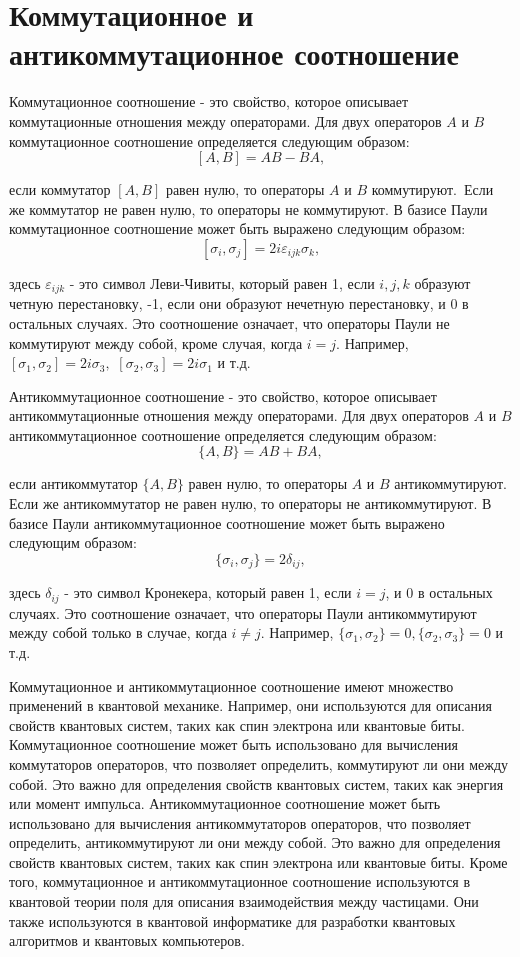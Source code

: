 \documentclass[a4paper]{report}
\begin{document}
\section{Коммутационное и антикоммутационное соотношение}

Коммутационное соотношение - это свойство, которое описывает коммутационные отношения между операторами. Для двух операторов ${A}$ и ${B}$ коммутационное соотношение определяется следующим образом:
$${[A, B] = AB - BA,}$$

\noindent если коммутатор ${[A, B]}$ равен нулю, то операторы ${A}$ и ${B}$ \mbox{коммутируют. Если} же коммутатор не равен нулю, то операторы не коммутируют. В базисе Паули коммутационное соотношение может быть выражено следующим образом:
$${[\sigma_i, \sigma_j] = 2i\varepsilon_{ijk}\sigma_k,}$$

\noindent здесь ${\varepsilon_{ijk}}$ - это символ Леви-Чивиты, который равен 1, если ${i, j, k}$ образуют четную перестановку, -1, если они образуют нечетную перестановку, и 0 в остальных случаях. Это соотношение означает, что операторы Паули не коммутируют между собой, кроме случая, когда ${i = j}$. Например, ${[\sigma_1, \sigma_2] = 2i\sigma_3,}$ ${[\sigma_2,\sigma_3] = 2i\sigma_1}$ и т.д.

Антикоммутационное соотношение - это свойство, которое описывает антикоммутационные отношения между операторами. Для двух операторов ${A}$ и ${B}$ антикоммутационное соотношение определяется следующим образом:
$${\{A, B\} = AB + BA,}$$

\noindent если антикоммутатор ${\{A, B}\}$ равен нулю, то операторы ${A}$ и ${B}$ антикоммутируют. Если же антикоммутатор не равен нулю, то операторы не антикоммутируют. В базисе Паули антикоммутационное соотношение может быть выражено следующим образом:
$${\{\sigma_i, \sigma_j\} = 2\delta_{ij},}$$

\noindent здесь ${\delta_{ij}}$ - это символ Кронекера, который равен 1, если ${i = j}$, и 0 в остальных случаях. Это соотношение означает, что операторы Паули антикоммутируют между собой только в случае, когда ${i \neq j}$. Например, ${\{\sigma_1, \sigma_2\} = 0, \{\sigma_2, \sigma_3\} = 0}$ и т.д.

Коммутационное и антикоммутационное соотношение имеют множество применений в квантовой механике. Например, они используются для описания свойств квантовых систем, таких как спин электрона или квантовые биты. Коммутационное соотношение может быть использовано для вычисления коммутаторов операторов, что позволяет определить, коммутируют ли они между собой. Это важно для определения свойств квантовых систем, таких как энергия или момент импульса.
Антикоммутационное соотношение может быть использовано для вычисления антикоммутаторов операторов, что позволяет определить, антикоммутируют ли они между собой. Это важно для определения свойств квантовых систем, таких как спин электрона или квантовые биты.
Кроме того, коммутационное и антикоммутационное соотношение используются в квантовой теории поля для описания взаимодействия между частицами. Они также используются в квантовой информатике для разработки квантовых алгоритмов и квантовых компьютеров.
\end{document}
